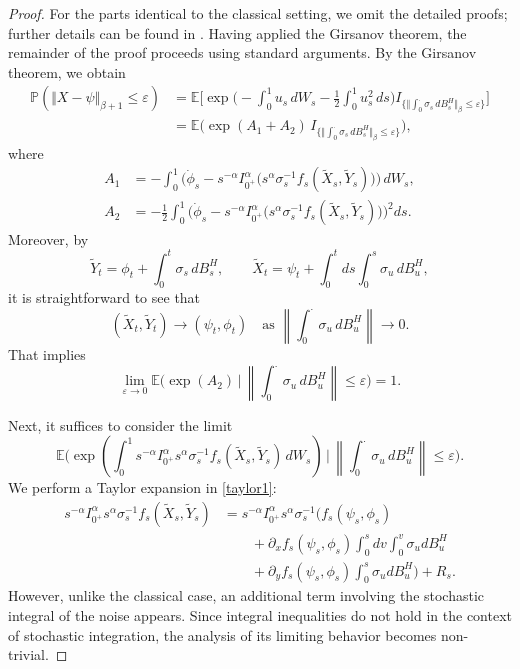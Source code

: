 \documentclass{article}
\theoremstyle{definition}  %
\theoremstyle{plain}  %
\begin{document}
\begin{proof}
For the parts identical to the classical setting, we omit the detailed proofs; further details can be found in \cite{Liu2026,Nualart}.
Having applied the Girsanov theorem, the remainder of the proof proceeds using standard arguments. By the Girsanov theorem, we obtain
\begin{align*}
\mathbb{P}(\Vert X-\psi\Vert_{\beta+1} \leq \varepsilon)
&= \mathbb{E}\Bigg[\exp\Bigg( -\int_0^1 u_s \, dW_s - \frac{1}{2} \int_0^1 u_s^2 \, ds\Bigg)
  I_{\big\{\Vert \int_0^\cdot \sigma_s \, dB^H_s\Vert_\beta \leq \varepsilon\big\}}\Bigg] \\
&= \mathbb{E}\Big(\exp(A_1+A_2)\,
  I_{\big\{\Vert \int_0^\cdot \sigma_s \, dB^H_s\Vert_\beta \leq \varepsilon\big\}}\Big),
\end{align*}
where
\begin{align*}
A_1 &= -\int_0^1 \Big(\dot{\phi}_s - s^{-\alpha} I_{0^+}^\alpha\big(s^{\alpha} \sigma_s^{-1}
      f_s(\tilde{X}_s,\tilde{Y}_s)\big)\Big)\, dW_s, \\
A_2 &= -\frac{1}{2}\int_0^1 \Big(\dot{\phi}_s - s^{-\alpha} I_{0^+}^\alpha\big(s^{\alpha} \sigma_s^{-1}
      f_s(\tilde{X}_s,\tilde{Y}_s)\big)\Big)^2 ds.
\end{align*}
Moreover, by
\begin{equation*}
\tilde{Y}_t = \phi_t + \int_0^t \sigma_s \, dB^H_s, 
\qquad 
\tilde{X}_t = \psi_t + \int_0^t ds \int_0^s \sigma_u \, dB^H_u,
\end{equation*}
it is straightforward to see that 
\[
(\tilde{X}_t,\tilde{Y}_t) \to (\psi_t,\phi_t)
\quad \text{as } \left\| \int_0^\cdot \sigma_u \, dB^H_u \right\|  \to 0.
\]
That implies
\[
\lim_{\varepsilon\to 0}
\mathbb{E}\Big(\exp(A_2)\,\Big|\,
\left\| \int_0^\cdot \sigma_u \, dB^H_u \right\| \leq \varepsilon \Big) = 1.
\]

 Next, it suffices to consider the limit
\begin{equation}
 \mathbb{E}\Big(\exp\left(\int_0^1  s^{-\alpha} I_{0^+}^\alpha s^{\alpha} \sigma_s^{-1}
      f_s(\tilde{X}_s,\tilde{Y}_s)\, dW_s\right)\,\Big|\,
\left\| \int_0^\cdot \sigma_u \, dB^H_u \right\| \leq \varepsilon \Big) .\label{taylor1}
\end{equation}
We perform a Taylor expansion in \eqref{taylor1}:
\begin{align*}
    s^{-\alpha} I_{0^+}^\alpha s^{\alpha} \sigma_s^{-1}
      f_s(\tilde{X}_s,\tilde{Y}_s) &= s^{-\alpha} I_{0^+}^\alpha s^{\alpha} \sigma_s^{-1}\Big(f_s(\psi_s, \phi_s) \\
     & \qquad + \partial_x f_s(\psi_s,\phi_s)\int_0^s dv \int_0^v \sigma_u dB^H_u \\
      & \qquad + \partial_y f_s(\psi_s,\phi_s)\int_0^s \sigma_u dB^H_u \Big) + R_s.
\end{align*}
However, unlike the classical case, an additional term involving the stochastic integral of the noise appears. Since integral inequalities do not hold in the context of stochastic integration, the analysis of its limiting behavior becomes non-trivial.


\end{proof}
\end{document}
